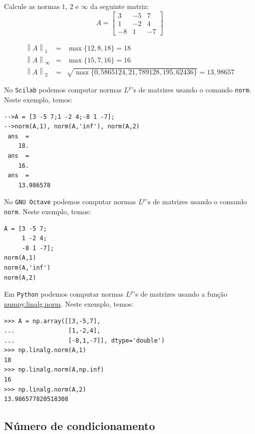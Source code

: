 \begin{ex}
Calcule as normas $1$, $2$ e $\infty$ da seguinte matriz:
\begin{equation}
  A=\left[
\begin{array}{ccc}
3 & -5 & 7\\
1 & -2 & 4\\
-8 & 1 & -7
\end{array}
\right]
\end{equation}
\end{ex}
\begin{sol}
  \begin{eqnarray}
    \left\|A\right\|_1 &=& \max\{12, 8, 18\}=18\\
    \left\|A\right\|_\infty &=& \max\{15, 7, 16\}=16\\
    \left\|A\right\|_2 &=& \sqrt{\max\{0,5865124, 21,789128, 195,62436\}}= 13,98657
  \end{eqnarray}

\ifisscilab
No \verb+Scilab+ podemos computar normas $L^p$'s de matrizes usando o comando \verb+norm+. Neste exemplo, temos:
\begin{verbatim}
-->A = [3 -5 7;1 -2 4;-8 1 -7];
-->norm(A,1), norm(A,'inf'), norm(A,2)
 ans  =
    18.
 ans  =
    16.
 ans  =
    13.986578
\end{verbatim}
\fi
\ifisoctave
No \verb+GNU Octave+ podemos computar normas $L^p$'s de matrizes usando o comando \verb+norm+. Neste exemplo, temos:
\begin{verbatim}
A = [3 -5 7;
     1 -2 4;
     -8 1 -7];
norm(A,1)
norm(A,'inf')
norm(A,2)
\end{verbatim}
\fi
\ifispython
Em \verb+Python+ podemos computar normas $L^p$'s de matrizes usando a função \href{https://docs.scipy.org/doc/numpy/reference/generated/numpy.linalg.norm.html#numpy.linalg.norm}{numpy.linalg.norm}. Neste exemplo, temos:
\begin{verbatim}
>>> A = np.array([[3,-5,7],
...               [1,-2,4],
...               [-8,1,-7]], dtype='double')
>>> np.linalg.norm(A,1)
18
>>> np.linalg.norm(A,np.inf)
16
>>> np.linalg.norm(A,2)
13.986577820518308
\end{verbatim}
\fi
\end{sol}

\subsection{Número de condicionamento}

